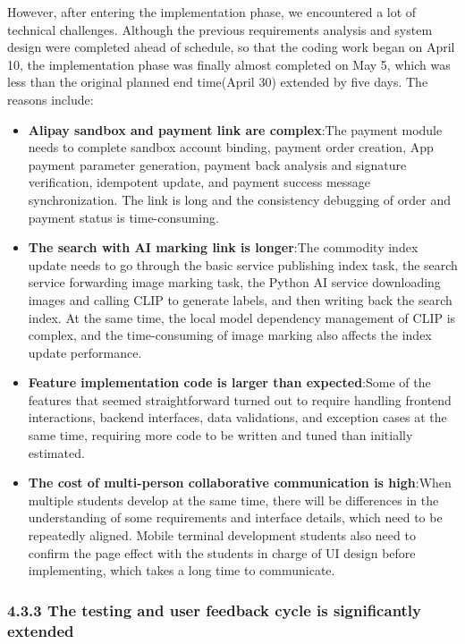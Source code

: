 \documentclass{article}
\begin{document}
However, after entering the implementation phase, we encountered a lot of technical challenges. Although the previous requirements analysis and system design were completed ahead of schedule, so that the coding work began on April 10, the implementation phase was finally almost completed on May 5, which was less than the original planned end time(April 30) extended by five days. The reasons include:

\begin{itemize}
    \item \textbf{Alipay sandbox and payment link are complex}:The payment module needs to complete sandbox account binding, payment order creation, App payment parameter generation, payment back analysis and signature verification, idempotent update, and payment success message synchronization. The link is long and the consistency debugging of order and payment status is time-consuming.
    \item \textbf{The search with AI marking link is longer}:The commodity index update needs to go through the basic service publishing index task, the search service forwarding image marking task, the Python AI service downloading images and calling CLIP to generate labels, and then writing back the search index. At the same time, the local model dependency management of CLIP is complex, and the time-consuming of image marking also affects the index update performance.
    \item \textbf{Feature implementation code is larger than expected}:Some of the features that seemed straightforward turned out to require handling frontend interactions, backend interfaces, data validations, and exception cases at the same time, requiring more code to be written and tuned than initially estimated.
    \item \textbf{The cost of multi-person collaborative communication is high}:When multiple students develop at the same time, there will be differences in the understanding of some requirements and interface details, which need to be repeatedly aligned. Mobile terminal development students also need to confirm the page effect with the students in charge of UI design before implementing, which takes a long time to communicate.
\end{itemize}

\subsubsection{4.3.3 The testing and user feedback cycle is significantly extended}
\end{document}
